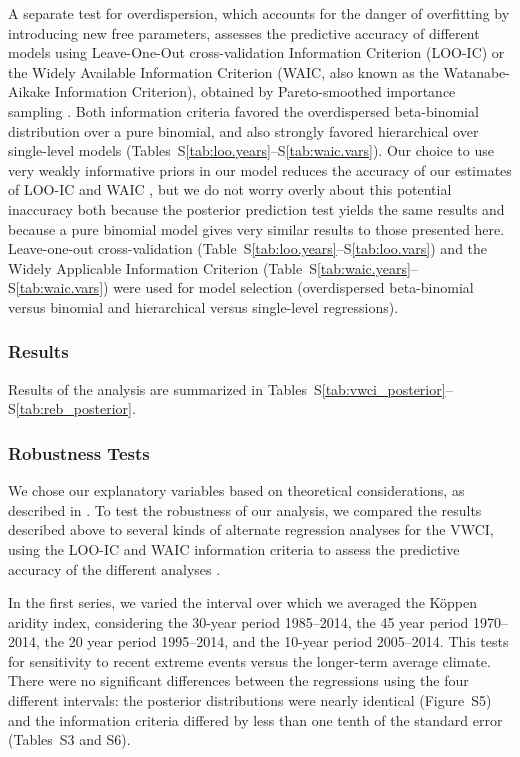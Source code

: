 \documentclass[draft]{agujournal}\usepackage{knitr}
\begin{document}
A separate test for overdispersion, which accounts for the danger of overfitting
by introducing new free parameters, assesses the predictive accuracy of different
models using
Leave-One-Out cross-validation Information Criterion (LOO-IC)
or the
Widely Available Information Criterion (WAIC, also known as the
Watanabe-Aikake Information Criterion),
obtained by Pareto-smoothed importance sampling \citep{gelman:predictive:2014,vehtari:loo:2016}.
Both information criteria favored the overdispersed beta-binomial distribution
over a pure binomial, and also strongly favored hierarchical over single-level
models (Tables~S\ref{tab:loo.years}--S\ref{tab:waic.vars}).
Our choice to use very weakly informative priors in our model reduces the
accuracy of our estimates of LOO-IC and WAIC \citep{vehtari:loo:2016},
but we do not worry overly about this potential inaccuracy both because the
posterior prediction test yields the same results and because a pure binomial
model gives very similar results to those presented here.
\else
Leave-one-out cross-validation (Table~S\ref{tab:loo.years}--S\ref{tab:loo.vars})
and the Widely Applicable Information Criterion
(Table~S\ref{tab:waic.years}--S\ref{tab:waic.vars}) were used for model selection
(overdispersed beta-binomial versus binomial and hierarchical versus single-level
regressions).
\fi

\subsubsection*{Results}

Results of the analysis are summarized in
Tables~S\ref{tab:vwci_posterior}--S\ref{tab:reb_posterior}.

\subsubsection*{Robustness Tests}
We chose our explanatory variables based on theoretical considerations, as
described in \citet{hess:drought:2016}. To test the robustness of our analysis,
we compared the results described above to several kinds of alternate regression
analyses for the VWCI, using the LOO-IC and WAIC information criteria to
assess the predictive accuracy of the different analyses 
\citep{gelman:predictive:2014,vehtari:loo:2016}.

In the first series, we varied the interval over which we averaged
the K\"oppen aridity index, considering the 30-year period 1985--2014,
the 45 year period 1970--2014,
the 20 year period 1995--2014, and the 10-year period 2005--2014. This tests
for sensitivity to recent extreme events versus the longer-term average
climate.
There were no significant differences between the regressions using the
four different intervals: the posterior distributions were nearly identical
(Figure~S5) and the information criteria differed by less than one tenth
of the standard error (Tables~S3 and S6).
\end{document}
